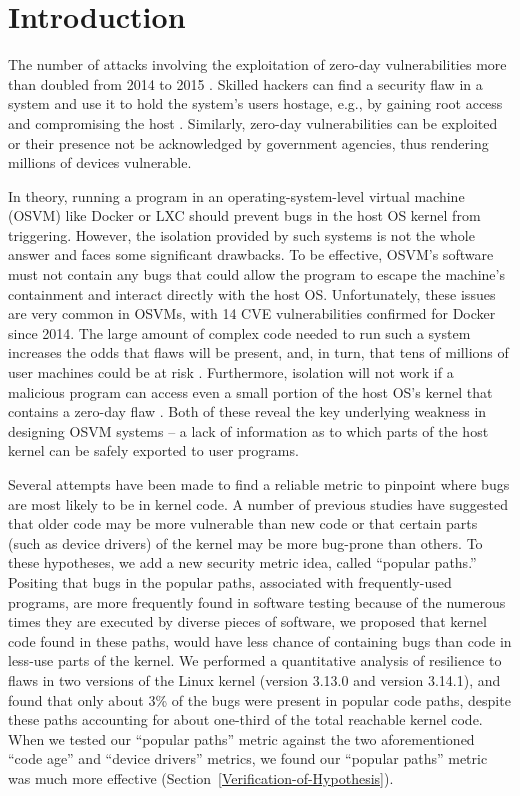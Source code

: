 \section{Introduction}
\label{sec.introduction}

The number of attacks involving the exploitation of zero-day vulnerabilities more than doubled 
from 2014 to 2015 \cite{zero-day}. Skilled hackers can find a security flaw in a system and use it to hold the system's users hostage, e.g., 
by gaining root access and compromising the host \cite{linux-0day}. Similarly, zero-day
vulnerabilities can be exploited \cite{fbi-0day} or their presence not be acknowledged \cite{nsa-0day} 
by government agencies, thus rendering millions of devices vulnerable.

In theory, running a program in an operating-system-level virtual machine (OSVM) like Docker \cite{Docker} or LXC \cite{LXC} should
prevent bugs in the host OS kernel from triggering. 
However, the isolation provided by such systems is not the whole answer and faces some significant drawbacks. 
To be effective, OSVM's software must not contain any bugs that could allow the program to escape the machine's containment 
and interact directly with the host OS. 
Unfortunately, these issues are very common in OSVMs, with 14 CVE vulnerabilities confirmed for Docker \cite{Docker-Vulnerabilities} since 2014. 
The large amount of complex code needed to run such a system increases the odds that flaws will be present, and, in turn, 
that tens of millions of user machines could be at risk \cite{linux-0day}.
Furthermore, isolation will not work if a malicious program can access even a small portion of the host OS's kernel 
that contains a zero-day flaw \cite{CVE-2016-5195}. 
Both of these reveal the key underlying weakness in designing OSVM systems -- a lack of information 
as to which parts of the host kernel can be safely exported to user programs. 

Several attempts have been made to find a reliable metric to pinpoint where bugs are most likely to be in kernel code. 
A number of previous studies have suggested that older code may be more vulnerable than new code \cite{ozment2006milk}  
or that certain parts (such as device drivers) of the kernel \cite{PittSFIeld} may be more bug-prone than others. 
To these hypotheses, we add a new security metric idea, called ``popular paths.'' 
Positing that bugs in the popular paths, associated with frequently-used programs, are more frequently found in software testing 
because of the numerous times they are executed by diverse pieces of software, we proposed that kernel code found in these paths, 
would have less chance of containing bugs than code in less-use parts of the kernel. 
We performed a quantitative analysis of resilience to flaws in two versions of the Linux kernel (version 3.13.0 and version 3.14.1), 
and found that only about 3\% of the bugs were present in popular code paths, 
despite these paths accounting for about one-third of the total reachable kernel code. 
When we tested our ``popular paths'' metric against the two aforementioned ``code age'' and ``device drivers'' metrics, 
we found our ``popular paths'' metric was much more effective (Section~{\ref{Verification-of-Hypothesis}}). 

